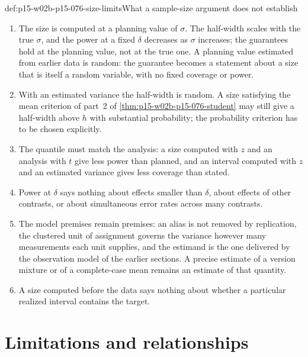 \begin{hbwarning}{def:p15-w02b-p15-076-size-limits}{What a sample-size argument does not establish}
\begin{enumerate}
\item The size is computed at a planning value of \(\sigma\). The
      half-width scales with the true \(\sigma\), and the power at a fixed
      \(\delta\) decreases as \(\sigma\) increases; the guarantees hold at
      the planning value, not at the true one. A planning value estimated
      from earlier data is random: the guarantee becomes a statement about
      a size that is itself a random variable, with no fixed coverage or
      power.
\item With an estimated variance the half-width is random. A size
      satisfying the mean criterion of part~2 of
      \cref{thm:p15-w02b-p15-076-student} may still give a half-width
      above \(h\) with substantial probability; the probability criterion
      has to be chosen explicitly.
\item The quantile must match the analysis: a size computed with \(z\) and
      an analysis with \(t\) give less power than planned, and an interval
      computed with \(z\) and an estimated variance gives less coverage
      than stated.
\item Power at \(\delta\) says nothing about effects smaller than
      \(\delta\), about effects of other contrasts, or about simultaneous
      error rates across many contrasts.
\item The model premises remain premises: an alias is not removed by
      replication, the clustered unit of assignment governs the variance
      however many measurements each unit supplies, and the estimand is
      the one delivered by the observation model of the earlier sections.
      A precise estimate of a version mixture or of a complete-case mean
      remains an estimate of that quantity.
\item A size computed before the data says nothing about whether a
      particular realized interval contains the target.
\end{enumerate}
\end{hbwarning}

\section{Limitations and relationships}
\label{sec:p15-w02b-p15-076-relationships}

